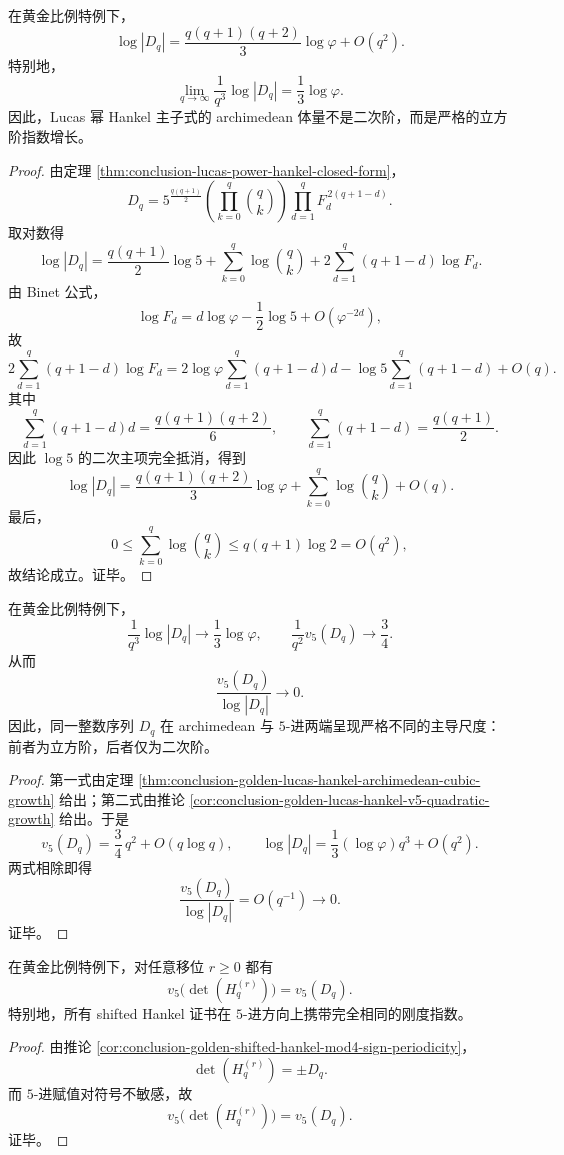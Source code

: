 \begin{theorem}\label{thm:conclusion-golden-lucas-hankel-archimedean-cubic-growth}
在黄金比例特例下，
\[
\log |D_q|
=
\frac{q(q+1)(q+2)}{3}\log\varphi
+ O(q^2).
\]
特别地，
\[
\lim_{q\to\infty}\frac{1}{q^3}\log |D_q|
=
\frac13\log\varphi.
\]
因此，Lucas 幂 Hankel 主子式的 archimedean 体量不是二次阶，而是严格的立方阶指数增长。
\end{theorem}
\begin{proof}
由定理 \ref{thm:conclusion-lucas-power-hankel-closed-form}，
\[
D_q
=
5^{\frac{q(q+1)}2}
\left(\prod_{k=0}^q \binom{q}{k}\right)
\prod_{d=1}^q F_d^{\,2(q+1-d)}.
\]
取对数得
\[
\log|D_q|
=
\frac{q(q+1)}2\log 5
+
\sum_{k=0}^q\log\binom{q}{k}
+
2\sum_{d=1}^q(q+1-d)\log F_d.
\]
由 Binet 公式，
\[
\log F_d=d\log\varphi-\frac12\log 5+O(\varphi^{-2d}),
\]
故
\[
2\sum_{d=1}^q(q+1-d)\log F_d
=
2\log\varphi\sum_{d=1}^q(q+1-d)d
-\log 5\sum_{d=1}^q(q+1-d)
+O(q).
\]
其中
\[
\sum_{d=1}^q(q+1-d)d=\frac{q(q+1)(q+2)}6,
\qquad
\sum_{d=1}^q(q+1-d)=\frac{q(q+1)}2.
\]
因此 \(\log 5\) 的二次主项完全抵消，得到
\[
\log|D_q|
=
\frac{q(q+1)(q+2)}{3}\log\varphi
+
\sum_{k=0}^q\log\binom{q}{k}
+O(q).
\]
最后，
\[
0\le \sum_{k=0}^q\log\binom{q}{k}\le q(q+1)\log 2=O(q^2),
\]
故结论成立。证毕。
\end{proof}

\begin{theorem}\label{thm:conclusion-golden-lucas-hankel-inf5-anisotropy}
在黄金比例特例下，
\[
\frac{1}{q^3}\log |D_q|\to \frac13\log\varphi,
\qquad
\frac{1}{q^2}v_5(D_q)\to \frac34.
\]
从而
\[
\frac{v_5(D_q)}{\log|D_q|}\longrightarrow 0.
\]
因此，同一整数序列 \(D_q\) 在 archimedean 与 \(5\)-进两端呈现严格不同的主导尺度：前者为立方阶，后者仅为二次阶。
\end{theorem}
\begin{proof}
第一式由定理 \ref{thm:conclusion-golden-lucas-hankel-archimedean-cubic-growth} 给出；第二式由推论 \ref{cor:conclusion-golden-lucas-hankel-v5-quadratic-growth} 给出。于是
\[
v_5(D_q)=\frac34\,q^2+O(q\log q),
\qquad
\log|D_q|=\frac13(\log\varphi)q^3+O(q^2).
\]
两式相除即得
\[
\frac{v_5(D_q)}{\log|D_q|}=O(q^{-1})\to 0.
\]
证毕。
\end{proof}

\begin{corollary}\label{cor:conclusion-golden-shifted-hankel-v5-invariance}
在黄金比例特例下，对任意移位 \(r\ge 0\) 都有
\[
v_5\!\bigl(\det(H_q^{(r)})\bigr)=v_5(D_q).
\]
特别地，所有 shifted Hankel 证书在 \(5\)-进方向上携带完全相同的刚度指数。
\end{corollary}
\begin{proof}
由推论 \ref{cor:conclusion-golden-shifted-hankel-mod4-sign-periodicity}，
\[
\det(H_q^{(r)})=\pm D_q.
\]
而 \(5\)-进赋值对符号不敏感，故
\[
v_5\!\bigl(\det(H_q^{(r)})\bigr)=v_5(D_q).
\]
证毕。
\end{proof}

